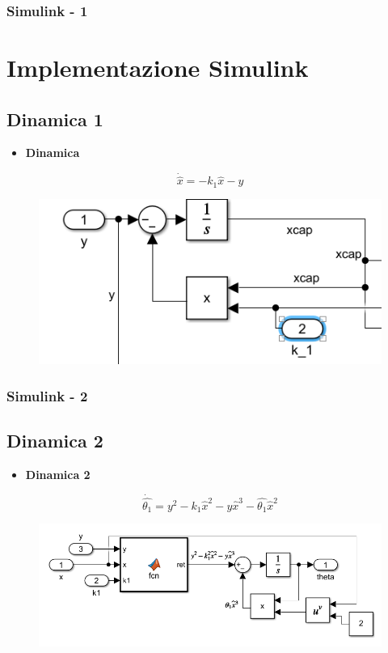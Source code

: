 \documentclass{beamer}
\begin{document}
\begin{frame}
    \frametitle{Simulink - 1}
    \section{Implementazione Simulink}
    \subsection{Dinamica 1}
    \begin{itemize}
        \item \textbf{Dinamica}
    \end{itemize}
    \begin{minipage}[t]{0.9\textwidth}
        \begin{equation*}
            \dot{\hat{x}}=-k_{1}\hat{x}-y
        \end{equation*}
        \begin{figure}
            \includegraphics[scale=0.4]{2022-05-15-17-24-30.png} %
        \end{figure}
    \end{minipage}
\end{frame}
\begin{frame}
    \frametitle{Simulink - 2} %
    \subsection{Dinamica 2}
    \begin{itemize}
        \item \textbf{Dinamica 2}
    \end{itemize}
    \begin{minipage}[t]{0.9\textwidth}
        \begin{equation*}
            \dot{\hat{\theta_{1}}}=y^2-k_{1}\hat{x}^2-y\hat{x}^3-\hat{\theta_{1}}\hat{x}^2
        \end{equation*}
        \begin{figure}
            \includegraphics[scale=0.3]{2022-05-15-17-59-30.png} %
        \end{figure}
    \end{minipage}
\end{frame}
\end{document}
